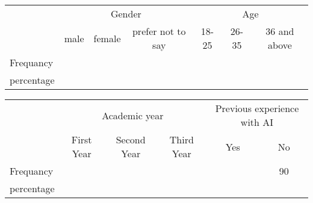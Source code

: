 \begin{table}[H]
	\begin{tabular}{l|ccc|ccc|}
		\cline{2-7}
		\multirow{2}{*}{}                & \multicolumn{3}{c|}{Gender} & \multicolumn{3}{c|}{Age}                                                                                                                      \\ \cline{2-7}
		                                 & \multicolumn{1}{c|}{male}   & \multicolumn{1}{c|}{female} & prefer not to say & \multicolumn{1}{c|}{18-25} & \multicolumn{1}{c|}{26-35} & \multicolumn{1}{c|}{36 and above} \\ \hline
		\multicolumn{1}{|l|}{Frequancy}  & \multicolumn{1}{c|}{}       & \multicolumn{1}{c|}{}       &                   & \multicolumn{1}{c|}{}      & \multicolumn{1}{c|}{}      & \multicolumn{1}{c|}{}             \\ \hline
		\multicolumn{1}{|l|}{percentage} & \multicolumn{1}{c|}{}       & \multicolumn{1}{c|}{}       &                   & \multicolumn{1}{c|}{}      & \multicolumn{1}{c|}{}      & \multicolumn{1}{c|}{}             \\ \hline
	\end{tabular}
\end{table}
\begin{table}[H]
	\begin{tabular}{l|ccc|cc|}
		\cline{2-6}
		\multirow{2}{*}{}                & \multicolumn{3}{c|}{Academic year} & \multicolumn{2}{c|}{Previous experience with AI}                                                                   \\ \cline{2-6}
		                                 & \multicolumn{1}{c|}{First Year}    & \multicolumn{1}{c|}{Second Year}                 & Third Year & \multicolumn{1}{c|}{Yes} & \multicolumn{1}{c|}{No} \\ \hline
		\multicolumn{1}{|l|}{Frequancy}  & \multicolumn{1}{c|}{}              & \multicolumn{1}{c|}{}                            &            & \multicolumn{1}{c|}{}    & \multicolumn{1}{c|}{90} \\ \hline
		\multicolumn{1}{|l|}{percentage} & \multicolumn{1}{c|}{}              & \multicolumn{1}{c|}{}                            &            & \multicolumn{1}{c|}{}    & \multicolumn{1}{c|}{}   \\ \hline
	\end{tabular}
\end{table}


